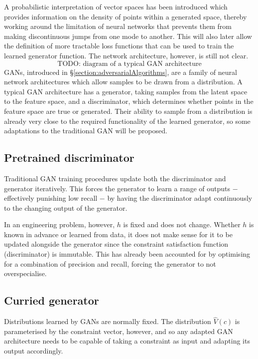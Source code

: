 \documentclass[../../main.tex]{subfiles}
\begin{document}
A probabilistic interpretation of vector spaces has been introduced which provides information on the density of points within a generated space, thereby working around the limitation of neural networks that prevents them from making discontinuous jumps from one mode to another.
This will also later allow the definition of more tractable loss functions that can be used to train the learned generator function.
The network architecture, however, is still not clear.
$$\text{TODO: diagram of a typical GAN architecture}$$
GANs, introduced in \S\ref{section:adversarialAlgorithms}, are a family of neural network architectures which allow samples to be drawn from a distribution.
A typical GAN architecture has a generator, taking samples from the latent space to the feature space, and a discriminator, which determines whether points in the feature space are true or generated.
Their ability to sample from a distribution is already very close to the required functionality of the learned generator, so some adaptations to the traditional GAN will be proposed.

\subsection{Pretrained discriminator} \label{subsection:pretrainedDiscriminator}

Traditional GAN training procedures update both the discriminator and generator iteratively.
This forces the generator to learn a range of outputs $-$ effectively punishing low recall $-$ by having the discriminator adapt continuously to the changing output of the generator.

In an engineering problem, however, $h$ is fixed and does not change.
Whether $h$ is known in advance or learned from data, it does not make sense for it to be updated alongside the generator since the constraint satisfaction function (discriminator) is immutable.
This has already been accounted for by optimising for a combination of precision and recall, forcing the generator to not overspecialise.

\subsection{Curried generator} \label{subsection:curriedGenerator}

Distributions learned by GANs are normally fixed.
The distribution $\hat{V}(c)$ is parameterised by the constraint vector, however, and so any adapted GAN architecture needs to be capable of taking a constraint as input and adapting its output accordingly.
\end{document}
